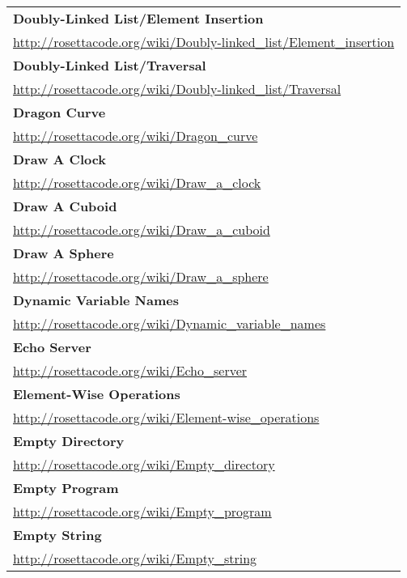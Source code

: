 \begin{longtable}{l}
\textbf{
Doubly-Linked List/Element Insertion } \\ \href{http://rosettacode.org/wiki/Doubly-linked\_list/Element\_insertion}{http://rosettacode.org/wiki/Doubly-linked\_list/Element\_insertion} \\
\textbf{Doubly-Linked List/Traversal } \\ \href{http://rosettacode.org/wiki/Doubly-linked\_list/Traversal}{http://rosettacode.org/wiki/Doubly-linked\_list/Traversal} \\
\textbf{
Dragon Curve } \\ \href{http://rosettacode.org/wiki/Dragon\_curve}{http://rosettacode.org/wiki/Dragon\_curve} \\
\textbf{Draw A Clock } \\ \href{http://rosettacode.org/wiki/Draw\_a\_clock}{http://rosettacode.org/wiki/Draw\_a\_clock} \\
\textbf{Draw A Cuboid } \\ \href{http://rosettacode.org/wiki/Draw\_a\_cuboid}{http://rosettacode.org/wiki/Draw\_a\_cuboid} \\
\textbf{Draw A Sphere } \\ \href{http://rosettacode.org/wiki/Draw\_a\_sphere}{http://rosettacode.org/wiki/Draw\_a\_sphere} \\
\textbf{
Dynamic Variable Names } \\ \href{http://rosettacode.org/wiki/Dynamic\_variable\_names}{http://rosettacode.org/wiki/Dynamic\_variable\_names} \\
\textbf{Echo Server } \\ \href{http://rosettacode.org/wiki/Echo\_server}{http://rosettacode.org/wiki/Echo\_server} \\
\textbf{Element-Wise Operations } \\ \href{http://rosettacode.org/wiki/Element-wise\_operations}{http://rosettacode.org/wiki/Element-wise\_operations} \\
\textbf{
Empty Directory } \\ \href{http://rosettacode.org/wiki/Empty\_directory}{http://rosettacode.org/wiki/Empty\_directory} \\
\textbf{Empty Program } \\ \href{http://rosettacode.org/wiki/Empty\_program}{http://rosettacode.org/wiki/Empty\_program} \\
\textbf{Empty String } \\ \href{http://rosettacode.org/wiki/Empty\_string}{http://rosettacode.org/wiki/Empty\_string} \\

\end{longtable}
